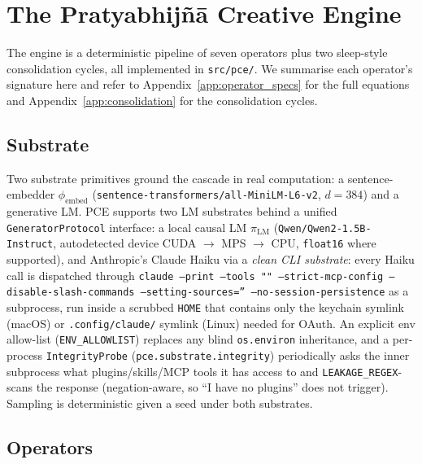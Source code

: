 \section{The Pratyabhij\~n\=a Creative Engine}\label{sec:engine}

\sloppy

The engine is a deterministic pipeline of seven operators plus two sleep-style consolidation cycles, all implemented in \texttt{src/pce/}. We summarise each operator's signature here and refer to Appendix~\ref{app:operator_specs} for the full equations and Appendix~\ref{app:consolidation} for the consolidation cycles.

\subsection{Substrate}
Two substrate primitives ground the cascade in real computation: a sentence-embedder $\phi_{\text{embed}}$ (\texttt{sentence-transformers/all-MiniLM-L6-v2}, $d=384$) and a generative LM. PCE supports two LM substrates behind a unified \texttt{GeneratorProtocol} interface: a local causal LM $\pi_{\text{LM}}$ (\texttt{Qwen/Qwen2-1.5B-Instruct}, autodetected device CUDA $\rightarrow$ MPS $\rightarrow$ CPU, \texttt{float16} where supported), and Anthropic's Claude Haiku via a \emph{clean CLI substrate}: every Haiku call is dispatched through \texttt{claude --print --tools "" --strict-mcp-config --disable-slash-commands --setting-sources='' --no-session-persistence} as a subprocess, run inside a scrubbed \texttt{HOME} that contains only the keychain symlink (macOS) or \texttt{.config/claude/} symlink (Linux) needed for OAuth. An explicit env allow-list (\texttt{ENV\_ALLOWLIST}) replaces any blind \texttt{os.environ} inheritance, and a per-process \texttt{IntegrityProbe} (\texttt{pce.substrate.integrity}) periodically asks the inner subprocess what plugins/skills/MCP tools it has access to and \texttt{LEAKAGE\_REGEX}-scans the response (negation-aware, so ``I have no plugins'' does not trigger). Sampling is deterministic given a seed under both substrates.

\subsection{Operators}

